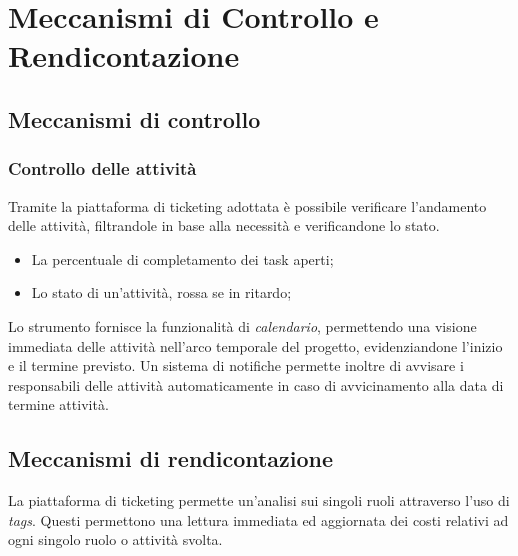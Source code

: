 \section{Meccanismi di Controllo e Rendicontazione}
\subsection{Meccanismi di controllo}
\subsubsection{Controllo delle attività}
Tramite la piattaforma di ticketing adottata è possibile verificare l'andamento delle attività, filtrandole in base alla necessità e verificandone lo stato.
\begin{itemize}
	\item La percentuale di completamento dei task aperti;
	\item Lo stato di un'attività, rossa se in ritardo;
\end{itemize}
Lo strumento fornisce la funzionalità di \textit{calendario}, permettendo una visione immediata delle attività nell'arco temporale del progetto, evidenziandone l'inizio e il termine previsto. Un sistema di notifiche permette inoltre di avvisare i responsabili delle attività automaticamente in caso di avvicinamento alla data di termine attività.

\subsection{Meccanismi di rendicontazione}
La piattaforma di ticketing permette un'analisi sui singoli ruoli attraverso l'uso di \textit{tags}. Questi permettono una lettura immediata ed aggiornata dei costi relativi ad ogni singolo ruolo o attività svolta.